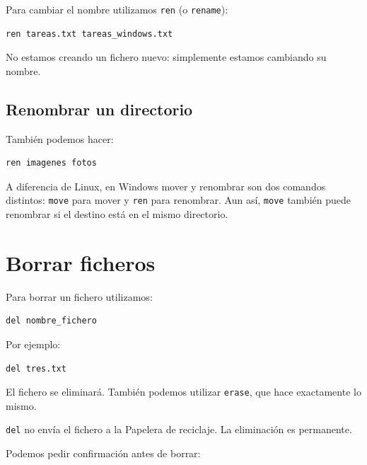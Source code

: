 \documentclass[11pt,a4paper]{article}
\begin{document}
Para cambiar el nombre utilizamos \texttt{ren} (o \texttt{rename}):

\begin{lstlisting}
ren tareas.txt tareas_windows.txt
\end{lstlisting}

\noindent No estamos creando un fichero nuevo: simplemente estamos
cambiando su nombre.

\subsection{Renombrar un directorio}

También podemos hacer:

\begin{lstlisting}
ren imagenes fotos
\end{lstlisting}

\begin{importante}
A diferencia de Linux, en Windows mover y renombrar son dos comandos
distintos: \texttt{move} para mover y \texttt{ren} para renombrar.
Aun así, \texttt{move} también puede renombrar si el destino está en
el mismo directorio.
\end{importante}

\section{Borrar ficheros}

Para borrar un fichero utilizamos:

\begin{lstlisting}
del nombre_fichero
\end{lstlisting}

\noindent Por ejemplo:

\begin{lstlisting}
del tres.txt
\end{lstlisting}

\noindent El fichero se eliminará. También podemos utilizar
\texttt{erase}, que hace exactamente lo mismo.

\begin{peligro}
\texttt{del} no envía el fichero a la Papelera de reciclaje. La
eliminación es permanente.
\end{peligro}

\noindent Podemos pedir confirmación antes de borrar:
\end{document}
